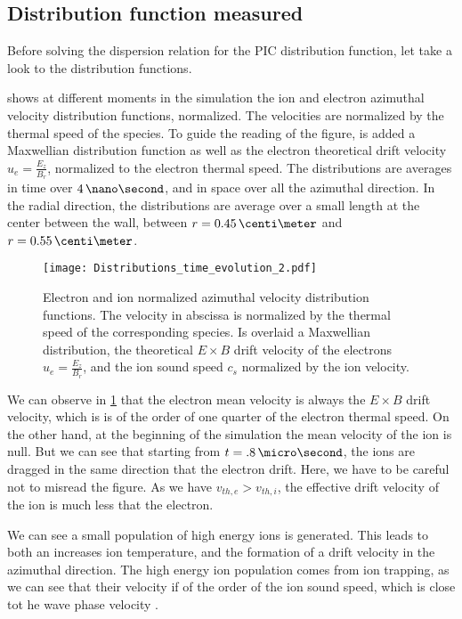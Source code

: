   \subsection{Distribution function measured} \label{subsec-VDFpic}
  
  Before solving the dispersion relation for the \ac{PIC} distribution function, let take a look to the distribution functions.
  
   shows at different moments in the simulation the ion and electron azimuthal velocity distribution functions, normalized.
  The velocities are normalized by the thermal speed of the species.
  To guide the reading of the figure, is added a Maxwellian distribution function as well as the electron theoretical drift velocity $u_e = \frac{E_z}{B_r}$, normalized to the electron thermal speed.
  The distributions are averages in time over $4\,\nano\second$, and in space over all the azimuthal direction.
  In the radial direction, the distributions are average over a small length at the center between the wall, between $r=0.45\,\centi\meter$ and $r=0.55\,\centi\meter$.
  
  \begin{figure}[hbtp]
    \centering
    \texttt{[image: Distributions\_time\_evolution\_2.pdf]}
    \caption{Electron and ion normalized azimuthal velocity distribution functions. The velocity in abscissa is normalized by the thermal speed of the corresponding species. Is overlaid a Maxwellian distribution, the theoretical $E\times B$ drift velocity of the electrons $u_e = \frac{E_z}{B_r}$, and the ion sound speed $c_s$ normalized by the ion velocity.}
    \label{fig-vdfs_pic_time}
  \end{figure}
  
  We can observe in \cref{fig-vdfs_pic_time} that the electron mean velocity is always the $E \times B$ drift velocity, which is is of the order of one quarter of the electron thermal speed.
  On the other hand, at the beginning of the simulation the mean velocity of the ion is null.
  But we can see that starting from $t=.8\,\micro\second$, the ions are dragged in the same direction that the electron drift.
  Here, we have to be careful not to misread the figure.
  As we have $v_{th, e} > v_{th, i}$, the effective drift velocity of the ion is much less that the electron.
  
  We can see a small population of high energy ions is generated.
  This leads to both an increases ion temperature, and the formation of a drift velocity in the azimuthal direction.
  The high energy ion population comes from ion trapping, as we can see that their velocity if of the order of the ion sound speed, which is close tot he wave phase velocity \citet{lafleur2018}.
  
